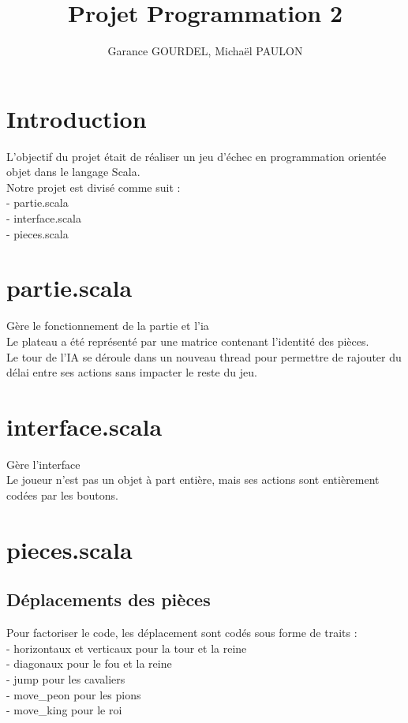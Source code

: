 \documentclass{article}
\title{Projet Programmation 2}
\date{}
\author{Garance GOURDEL, Michaël PAULON}
\begin{document}
\maketitle
\section{Introduction}
L'objectif du projet était de réaliser un jeu d'échec en programmation orientée objet dans le langage Scala. \\
Notre projet est divisé comme suit : \\
 - partie.scala \\
 - interface.scala \\
 - pieces.scala \\

\section{partie.scala}
Gère le fonctionnement de la partie et l'ia\\
Le plateau a été représenté par une matrice contenant l'identité des pièces. \\
Le tour de l'IA se déroule dans un nouveau thread pour permettre de rajouter du délai entre ses actions sans impacter le reste du jeu.



\section{interface.scala}
Gère l'interface \\
Le joueur n'est pas un objet à part entière, mais ses actions sont entièrement codées par les boutons.\\

\section{pieces.scala}
\subsection{Déplacements des pièces}
Pour factoriser le code, les déplacement sont codés sous forme de traits : \\
 - horizontaux et verticaux pour la tour et la reine \\
 - diagonaux pour le fou et la reine \\
 - jump pour les cavaliers \\
 - move\_peon pour les pions \\
 - move\_king pour le roi \\
\end{document}
